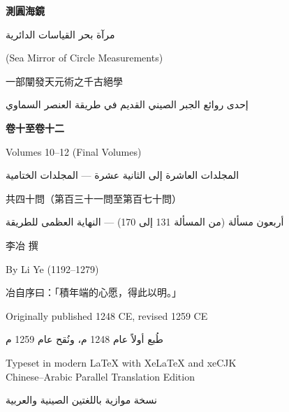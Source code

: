 \documentclass[11pt,a4paper]{article}
\newcommand{\ar}[1]{\arabicfont\beginR #1\endR}
\begin{document}
\begin{titlepage}
\begin{center}
\vspace*{1.5cm}

{\fontsize{30}{38}\selectfont\bfseries\color{titlecolor} 測圓海鏡}

\vspace{0.5cm}
{\Large\color{sectioncolor}\ar{مرآة بحر القياسات الدائرية}}

\vspace{0.3cm}
{\normalsize\color{sectioncolor} (Sea Mirror of Circle Measurements)}

\vspace{0.5cm}
{\normalsize\color{notecolor} 一部闡發天元術之千古絕學}

\vspace{0.2cm}
{\footnotesize\ar{إحدى روائع الجبر الصيني القديم في طريقة العنصر السماوي}}

\vspace{1.8cm}
{\fontsize{20}{26}\selectfont\bfseries 卷十至卷十二}

\vspace{0.3cm}
{\large Volumes 10--12 (Final Volumes)}

\vspace{0.3cm}
{\large\ar{المجلدات العاشرة إلى الثانية عشرة — المجلدات الختامية}}

\vspace{0.3cm}
{\normalsize\color{notecolor} 共四十問（第百三十一問至第百七十問）}

\vspace{0.2cm}
{\footnotesize\ar{أربعون مسألة (من المسألة 131 إلى 170) — النهاية العظمى للطريقة}}

\vspace{2cm}
{\large 李冶 撰}

\vspace{0.3cm}
{\normalsize By Li Ye (1192--1279)}

\vspace{0.3cm}
{\small\color{notecolor} 冶自序曰：「積年端的心愿，得此以明。」}

\vspace{1.5cm}
{\small Originally published 1248 CE, revised 1259 CE}

\vspace{0.3cm}
{\small\ar{طُبع أولاً عام 1248 م، ونُقح عام 1259 م}}

\vspace{0.8cm}
{\footnotesize\color{notecolor}
Typeset in modern LaTeX with XeLaTeX and xeCJK\\
Chinese--Arabic Parallel Translation Edition}

\vspace{0.3cm}
{\footnotesize\ar{نسخة موازية باللغتين الصينية والعربية}}

\end{center}
\end{titlepage}
\end{document}
